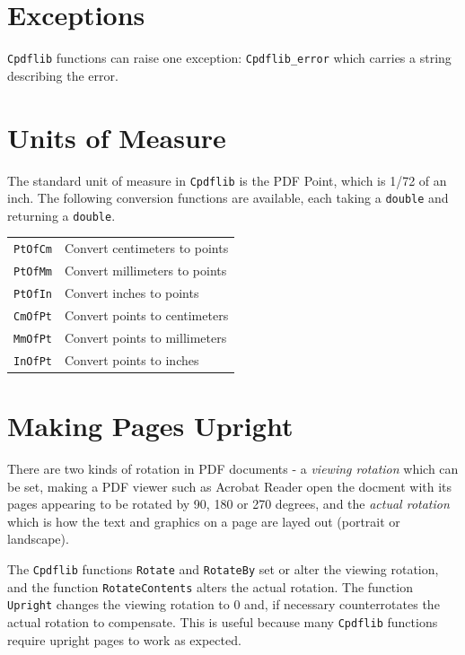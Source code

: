 \documentclass[a4paper]{memoir}
\begin{document}
\section{Exceptions}

\verb!Cpdflib! functions can raise one exception: \verb!Cpdflib_error! which carries a
string describing the error.

\section{Units of Measure}
The standard unit of measure in \verb!Cpdflib! is the PDF Point, which is 1/72 of an inch. The following conversion functions are available, each taking a \verb!double! and returning a \verb!double!.
\begin{framed}
\begin{tabular}{ll}
\verb!PtOfCm! & Convert centimeters to points\\
\verb!PtOfMm! & Convert millimeters to points\\
\verb!PtOfIn! & Convert inches to points\\[3mm]
\verb!CmOfPt! & Convert points to centimeters\\
\verb!MmOfPt! & Convert points to millimeters\\
\verb!InOfPt! & Convert points to inches
\end{tabular}
\end{framed}

\section{Making Pages Upright}

There are two kinds of rotation in PDF documents - a \textit{viewing rotation}
which can be set, making a PDF viewer such as Acrobat Reader open the docment
with its pages appearing to be rotated by 90, 180 or 270 degrees, and the
\textit{actual rotation} which is how the text and graphics on a page are layed
out (portrait or landscape).

The \verb!Cpdflib! functions \verb!Rotate! and \verb!RotateBy! set or alter
the viewing rotation, and the function \verb!RotateContents! alters the actual
rotation. The function \verb!Upright! changes the viewing rotation to 0 and, if
necessary counterrotates the actual rotation to compensate. This is useful
because many \verb!Cpdflib! functions require upright pages to work as
expected.
\end{document}

